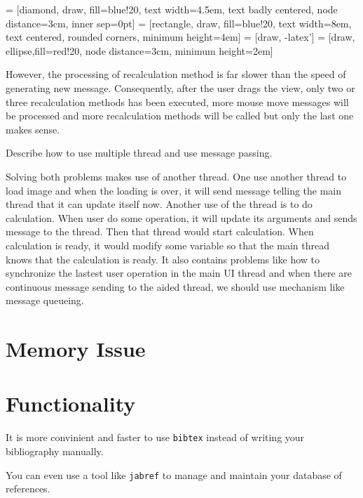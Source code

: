 \documentclass[MSc]{icldt}
\begin{document}
 = [diamond, draw, fill=blue!20, 
    text width=4.5em, text badly centered, node distance=3cm, inner sep=0pt]
 = [rectangle, draw, fill=blue!20, 
    text width=8em, text centered, rounded corners, minimum height=4em]
 = [draw, -latex']
 = [draw, ellipse,fill=red!20, node distance=3cm,
    minimum height=2em]
    

 However, the processing of recalculation method is far slower than the speed of generating new message. Consequently, after the user drags the view, only two or three recalculation methods has been executed, more mouse move messages will be processed and more recalculation methods will be called but only the last one makes sense. 

Describe how to use multiple thread and use message passing.


Solving both problems makes use of another thread. One use another thread to load image and when the loading is over, it will send message telling the main thread that it can update itself now. Another use of the thread is to do calculation. When user do some operation, it will update its arguments and sends message to the thread. Then that thread would start calculation. When calculation is ready, it would modify some variable so that the main thread knows that the calculation is ready. It also contains problems like how to synchronize the lastest user operation in the main UI thread and when there are continuous message sending to the aided thread, we should use mechanism like message queueing. 
 

\chapter{Memory Issue}



\chapter{Functionality}


\begin{thebibliography}{123}
\raggedright

 It is more convinient and faster to use \texttt{bibtex} instead 
of writing your bibliography manually.

You can even use a tool like \texttt{jabref} to manage and maintain your 
database of references.

\end{thebibliography}
\end{document}
